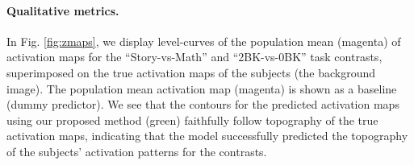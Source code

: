 
\paragraph{Qualitative metrics.} In Fig. \ref{fig:zmaps}, we display level-curves of the population mean (magenta) of
activation maps for the ``Story-vs-Math'' and ``2BK-vs-0BK'' task contrasts, superimposed on the true activation maps of the
subjects (the background image).  The population mean activation map (magenta) is shown as a baseline (dummy predictor).
We see that the contours for the predicted activation maps using our proposed method (green)
faithfully follow topography of the true activation maps, indicating that the model successfully
predicted the topography of the subjects' activation patterns for the contrasts.


